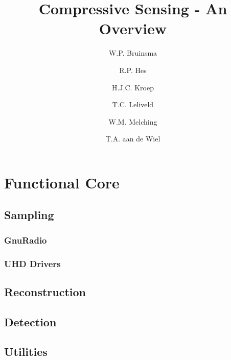 \documentclass[a4paper, openany, oneside]{memoir}
\title{Compressive Sensing - An Overview}
\author{W.P. Bruinsma \and R.P. Hes \and H.J.C. Kroep \and T.C. Leliveld \and W.M. Melching \and T.A. aan de Wiel}
\begin{document}
\chapter{Functional Core}

\section{Sampling}
\label{sec:sampling}

\subsection{GnuRadio}
\label{sec:gnuradio}

\subsection{UHD Drivers}
\label{sec:uhd-drivers}




\section{Reconstruction}
\label{sec:reconstruction}

\section{Detection}
\label{sec:detection}

\section{Utilities}
\label{sec:utilities}
\end{document}
